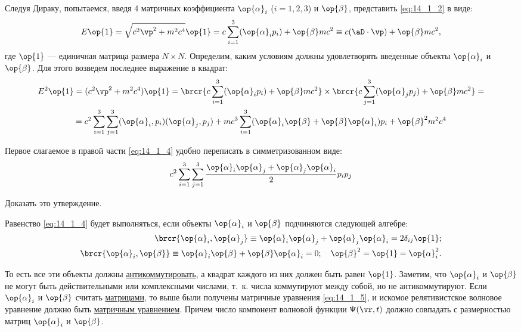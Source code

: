 Следуя Дираку, попытаемся, введя 4 матричных коэффициента $\op{\alpha}_i$ ($i = 1, 2, 3$) и $\op{\beta}$, представить \eqref{eq:14_1_2} в виде:
\begin{equation}
\label{eq:14_1_3}
E \op{1} = \sqrt{c^2 \vp^2 + m^2 c^4} \op{1} = c \sum_{i=1}^3 (\op{\alpha}_i p_i) + \op{\beta} mc^2 \equiv c(\aD \cdot \vp) + \op{\beta} mc^2,
\end{equation}
где $\op{1}$ --- единичная матрица размера $N \times N$. Определим, каким условиям должны удовлетворять введенные объекты $\op{\alpha}_i$ и $\op{\beta}$. Для этого возведем последнее выражение в квадрат:
\begin{gather}
E^2 \op{1} = (c^2 \vp^2 + m^2 c^4)\op{1} = \brcr{c \sum_{i=1}^3 (\op{\alpha}_i p_i) + \op{\beta} mc^2} \times \brcr{c \sum_{j=1}^3 (\op{\alpha}_j p_j) + \op{\beta} mc^2} = \nonumber \\
\label{eq:14_1_4}
= {c^2 \sum_{i=1}^3 \sum_{j = 1}^3 (\op{\alpha}_i, p_i)(\op{\alpha}_j, p_j)} + mc^3 \sum_{i=1}^3 (\op{\alpha}_i \op{\beta} + \op{\beta} \op{\alpha}_i) p_i + \op{\beta}^2 m^2 c^4
\end{gather}

Первое слагаемое в правой части \eqref{eq:14_1_4} удобно переписать в симметризованном виде:
$$
c^2 \sum_{i=1}^3 \sum_{j = 1}^3 \frac{ \op{\alpha}_i \op{\alpha}_j + \op{\alpha}_j \op{\alpha}_i }{2} p_i p_j
$$

\begin{excr}
Доказать это утверждение.
\end{excr}

Равенство \eqref{eq:14_1_4} будет выполняться, если объекты $\op{\alpha}_i$ и $\op{\beta}$ подчиняются следующей алгебре:
\begin{eqnarray}
\label{eq:14_1_5}
  \brcr{\op{\alpha}_i, \op{\alpha}_j } \equiv \op{\alpha}_i \op{\alpha}_j  + \op{\alpha}_j \op{\alpha}_i = 2 \delta_{ij} \op{1}; \nonumber \\
  \brcr{\op{\alpha}_i, \op{\beta} } \equiv \op{\alpha}_i \op{\beta} + \op{\beta} \op{\alpha}_i = 0;~~~\op{\beta}^2 = \op{1} = \op{\alpha}_i^2.
\end{eqnarray}

То есть все эти объекты должны \underline{антикоммутировать}, а квадрат каждого из них должен быть равен $\op{1}$. Заметим, что $\op{\alpha}_i$ и $\op{\beta}$ не могут быть действительными или комплексными числами, т.~к. числа коммутируют между собой, но не антикоммутируют. Если $\op{\alpha}_i$ и $\op{\beta}$ считать \underline{матрицами}, то выше были получены матричные уравнения \eqref{eq:14_1_5}, и искомое релятивистское волновое уравнение должно быть \underline{матричным уравнением}. Причем число компонент волновой функции $\mathsf{\Psi}(\vr, t)$ должно совпадать с размерностью матриц $\op{\alpha}_i$ и $\op{\beta}$. 

